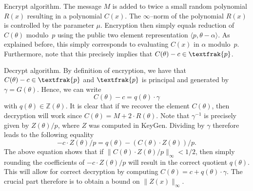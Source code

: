 \documentclass[a4paper, 12pt]{article}
\newcommand{\ndash}{\nobreakdash --}
\newcommand{\bb}[1]{\mathbb{#1}}
\newcommand{\tfr}[1]{\textfrak{#1}}
\newcommand{\tsf}[1]{\textsf{#1}}
\begin{document}
	\begin{paralgorithm}{\tsf{Encrypt} algorithm.}
		The message $M$ is added to twice a small random polynomial $R(x)$ resulting in a polynomial $C(x)$. 
		The $\infty$\ndash norm of the polynomial $R(x)$ is controlled by the parameter $\mu$. 
		Encryption then simply equals reduction of $C(\theta)$ modulo~$p$ using the public two element representation $\langle p, \theta - \alpha\rangle$.
		As explained before, this simply corresponds to evaluating $C(x)$ in $\alpha$ modulo~$p$.
		Furthermore, note that this precisely implies that $C(\theta)-c \in \tfr{p}$.
	\end{paralgorithm}
	
	\begin{paralgorithm}{\tsf{Decrypt} algorithm.}
		By definition of encryption, we have that $C(\theta)-c \in \tfr{p}$ and $\tfr{p}$ is principal and generated by $\gamma = G(\theta)$.
		Hence, we can write
		\[
			C(\theta)-c = q(\theta) \cdot \gamma
		\]
		with $q(\theta) \in \bb{Z}(\theta)$. It is clear that if we recover the element $C(\theta)$, then decryption will work since $C(\theta) = M+2 \cdot R(\theta)$.
		Note that $\gamma^{-1}$ is precisely given by $Z(\theta)/p$, where $Z$ was computed in \tsf{KeyGen}.
		Dividing by $\gamma$ therefore leads to the following equality
		\[
			-c \cdot Z(\theta)/p = q(\theta) - (C(\theta) \cdot Z(\theta))/p.
		\]
		The above equation shows that if $\| C(\theta) \cdot Z(\theta)/p \|_\infty < 1/2$, then simply rounding the coefficients of $-c \cdot Z(\theta)/p$ will result in the correct quotient $q(\theta)$.
		This will allow for correct decryption by computing $C(\theta) = c+q(\theta) \cdot \gamma$.
		The crucial part therefore is to obtain a bound on $\| Z(x) \|_\infty$.
	\end{paralgorithm}
	
\end{document}
